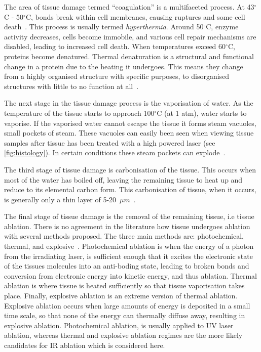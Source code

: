 The area of tissue damage termed ``coagulation'' is a multifaceted process. At 43$^{\circ}$C - 50$^{\circ}$C, bonds break within cell membranes, causing ruptures and some cell death~\cite{welch2011optical,wright2015quantitative}. This process is usually termed \textit{hyperthermia}. Around 50$^{\circ}$C, enzyme activity decreases, cells become immobile, and various cell repair mechanisms are disabled, leading to increased cell death. When temperatures exceed 60$^{\circ}$C, proteins become denatured. Thermal denaturation is a structural and functional change in a protein due to the heating it undergoes. This means they change from a highly organised structure with specific purposes, to disorganised structures with little to no function at all~\cite{niemz2013laser}.  %

The next stage in the tissue damage process is the vaporisation of water. As the temperature of the tissue starts to approach 100${^{\circ}}$C (at 1 atm), water starts to vaporise. If the vaporised water cannot escape the tissue it forms steam vacuoles, small pockets of steam. These vacuoles can easily been seen when viewing tissue samples after tissue has been treated with a high powered laser (see \cref{fig:histology}). In certain conditions these steam pockets can explode~\cite{petrella2013popcorn}.


The third stage of tissue damage is carbonisation of the tissue. This occurs when most of the water has boiled off, leaving the remaining tissue to heat up and reduce to its elemental carbon form. This carbonisation of tissue, when it occurs, is generally only a thin layer of 5-20~$\mu m$~\cite{welch2011optical,verdaasdonk1990explosive}.

The final stage of tissue damage is the removal of the remaining tissue, i.e tissue ablation. There is no agreement in the literature how tissue undergoes ablation with several methods proposed. The three main methods are: photochemical, thermal, and explosive~\cite{husinsky1990mechanisms,kitai1991physics,oraevsky1991pulsed}. 
Photochemical ablation is when the energy of a photon from the irradiating laser, is sufficient enough that it excites the electronic state of the tissues molecules into an anti-boding state, leading to broken bonds and conversion from electronic energy into kinetic energy, and thus ablation.
Thermal ablation is where tissue is heated sufficiently so that tissue vaporisation takes place. 
Finally, explosive ablation is an extreme version of thermal ablation. Explosive ablation occurs when large amounts of energy is deposited in a small time scale, so that none of the energy can thermally diffuse away, resulting in explosive ablation.
Photochemical ablation, is usually applied to UV laser ablation, whereas thermal and explosive ablation regimes are the more likely candidates for IR ablation which is considered here.

